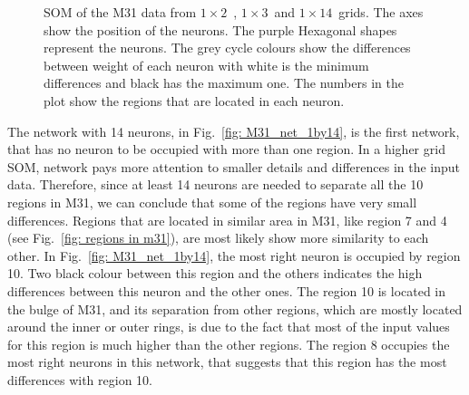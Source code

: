         \begin{figure}
            \hfill
             \hfill
            \caption{SOM of the M31 data from $1\times2$~, $1\times3$~and $1\times14$~grids. The axes show the position of the neurons. The purple Hexagonal shapes represent the neurons. The grey cycle colours show the differences between weight of each neuron with white is the minimum differences and black has the maximum one. The numbers in the plot show the regions that are located in each neuron.}
            \label{fig: M31_nets_1d}
        \end{figure}
        
        The network with 14 neurons, in Fig.~\ref{fig: M31_net_1by14}, is the first network, that has no neuron to be occupied with more than one region.
        In a higher grid SOM, network pays more attention to smaller details and differences in the input data.
        Therefore, since at least 14 neurons are needed to separate all the 10 regions in M31, we can conclude that some of the regions have very small differences.
        Regions that are located in similar area in M31, like region 7 and 4 (see Fig.~\ref{fig: regions in m31}), are most likely show more similarity to each other.
        In Fig.~\ref{fig: M31_net_1by14}, the most right neuron is occupied by region 10.
        Two black colour between this region and the others indicates the high differences between this neuron and the other ones.
        The region 10 is located in the bulge of M31, and its separation from other regions, which are mostly located around the inner or outer rings, is due to the fact that most of the input values for this region is much higher than the other regions.
        The region 8 occupies the most right neurons in this network, that suggests that this region has the most differences with region 10.
        
